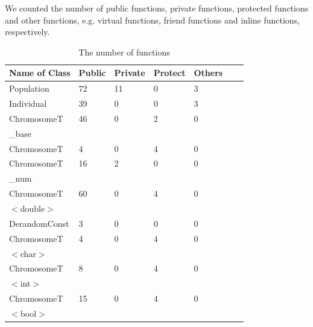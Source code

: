 \documentclass[twocolumn]{article}
\begin{document}
\noindent
We counted the number of public functions, private functions,
protected functions and other functions, e.g. virtual functions,
friend functions and inline functions, respectively.

\begin{table}[h]
\begin{center}
\caption{The number of functions}
\label{NoFunctions}
{\scriptsize
\begin{tabular}{|l|l|l|l|l|l|l|}\hline
Name of Class              & Public & Private & Protect & Others  \\\hline\hline
Population                 &     72 &      11 &       0 &       3 \\\hline
Individual                 &     39 &       0 &       0 &       3 \\\hline
ChromosomeT                &     46 &       0 &       2 &       0 \\
\hspace*{2mm} \_base       &        &         &         &         \\\hline
ChromosomeT                &      4 &       0 &       4 &       0 \\\hline
ChromosomeT                &     16 &       2 &       0 &       0 \\
\hspace*{2mm} \_num        &        &         &         &         \\\hline
ChromosomeT                &     60 &       0 &       4 &       0 \\
\hspace*{2mm} $<$double$>$ &        &         &         &         \\\hline
DerandomConst              &      3 &       0 &       0 &       0 \\\hline
ChromosomeT                &      4 &       0 &       4 &       0 \\
\hspace*{2mm} $<$char$>$   &        &         &         &         \\\hline 
ChromosomeT                &      8 &       0 &       4 &       0 \\
\hspace*{2mm} $<$int$>$    &        &         &         &         \\\hline 
ChromosomeT                &     15 &       0 &       4 &       0 \\
\hspace*{2mm} $<$bool$>$   &        &         &         &         \\\hline 

\end{tabular}}
\end{center}
\end{table}
\end{document}
